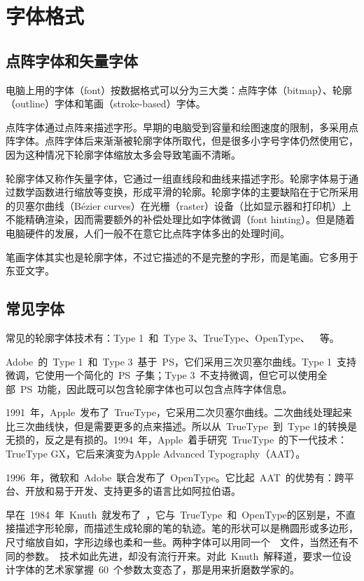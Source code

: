 \section{字体格式}
\label{sec:font}

\subsection{点阵字体和矢量字体}
电脑上用的字体（font）按数据格式可以分为三大类：点阵字体（bitmap）、轮廓（outline）字体和笔画（stroke-based）字体。

点阵字体通过点阵来描述字形。早期的电脑受到容量和绘图速度的限制，多采用点阵字体。点阵字体后来渐渐被轮廓字体所取代，但是很多小字号字体仍然使用它，因为这种情况下轮廓字体缩放太多会导致笔画不清晰。

轮廓字体又称作矢量字体，它通过一组直线段和曲线来描述字形。轮廓字体易于通过数学函数进行缩放等变换，形成平滑的轮廓。轮廓字体的主要缺陷在于它所采用的贝塞尔曲线（Bézier curves）在光栅（raster）设备（比如显示器和打印机）上不能精确渲染，因而需要额外的补偿处理比如字体微调（font hinting）。但是随着电脑硬件的发展，人们一般不在意它比点阵字体多出的处理时间。

笔画字体其实也是轮廓字体，不过它描述的不是完整的字形，而是笔画。它多用于东亚文字。

\subsection{常见字体}

常见的轮廓字体技术有：Type 1~和~Type 3、TrueType、OpenType、~\MF~等。

Adobe~的~Type 1~和~Type 3~基于~PS，它们采用三次贝塞尔曲线。Type 1~支持微调，它使用一个简化的~PS~子集；Type 3~不支持微调，但它可以使用全部~PS~功能，因此既可以包含轮廓字体也可以包含点阵字体信息。
    
1991~年，Apple~发布了~TrueType，它采用二次贝塞尔曲线。二次曲线处理起来比三次曲线快，但是需要更多的点来描述。所以从~TrueType~到~Type 1的转换是无损的，反之是有损的。1994~年，Apple~着手研究~TrueType~的下一代技术：TrueType GX，它后来演变为Apple Advanced Typography（AAT）。

1996~年，微软和~Adobe~联合发布了~OpenType。它比起~AAT~的优势有：跨平台、开放和易于开发、支持更多的语言比如阿拉伯语。

早在~1984~年~Knuth~就发布了~\MF，它与~TrueType~和~OpenType的区别是，不直接描述字形轮廓，而描述生成轮廓的笔的轨迹。笔的形状可以是椭圆形或多边形，尺寸缩放自如，字形边缘也柔和一些。两种字体可以用同一个~\MF~文件，当然还有不同的参数。\MF~技术如此先进，却没有流行开来。对此~Knuth~解释道，要求一位设计字体的艺术家掌握~60~个参数太变态了，那是用来折磨数学家的。


